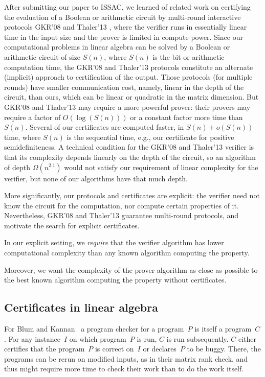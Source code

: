 \documentclass{article}
\newcommand{\psdness}{positive semidefiniteness\xspace}
\begin{document}
After submitting our paper to ISSAC, we learned of related work on
certifying the evaluation of a Boolean or arithmetic circuit 
by multi-round interactive protocols
GKR'08 \cite{Goldwasser:2008:delegating} and Thaler'13
\cite{Thaler:2013:crypto}, 
where the verifier runs in  
essentially linear time in the input size
and the prover is limited in compute power.
Since our computational problems in linear algebra
can be solved by a Boolean or arithmetic circuit of size $S(n)$,
where $S(n)$ is the bit or arithmetic computation time, 
the GKR'08 and Thaler'13 protocols constitute an alternate (implicit) approach
to certification of the output.  Those protocols (for multiple rounds) have
smaller communication cost, namely, linear in the depth of the circuit, 
than ours, which can be linear or quadratic in the matrix dimension.
But GKR'08 and Thaler'13 may require a more powerful prover:
their provers may require
a factor of $O(\log(S(n)))$ or a constant factor more time than $S(n)$.
Several of our certificates
are computed faster, in $S(n) + o(S(n))$ time, where $S(n)$ is the sequential time,
e.g., our certificate for \psdness.
A technical condition for the GKR'08 and Thaler'13 verifier
is that its complexity depends linearly on the depth of the circuit, 
so an algorithm of depth $\Omega(n^{2.1})$ would not satisfy our requirement
of linear complexity for the verifier,  
but none of our algorithms have that much depth. 

More significantly, our protocols and certificates are explicit:
the verifier need not know the circuit for the computation,
nor compute certain properties of it.
Nevertheless, GKR'08 \cite{Goldwasser:2008:delegating} and Thaler'13  \cite{Thaler:2013:crypto}
guarantee multi-round protocols,  
and motivate the search for explicit certificates. 

 
In our explicit setting, we {\em require} that the verifier algorithm has
lower computational complexity than any known algorithm computing the property.
 
Moreover, we want  
the complexity of the prover algorithm  
as close as
possible to the best known algorithm computing the property without
certificates.  

\subsection{Certificates in linear algebra}
For Blum and Kannan~\cite{Blum:1995:checkwork} a program checker for a
program~$P$ is itself a program~$C$. For any instance~$I$ on which program~$P$
is run, $C$ is run subsequently. $C$ either certifies that the program~$P$ is
correct on~$I$ or declares~$P$ to be buggy. There, the programs can be rerun on
modified inputs, as in their matrix rank check, and thus might require more time
to check their work than to do the work itself.
\end{document}

